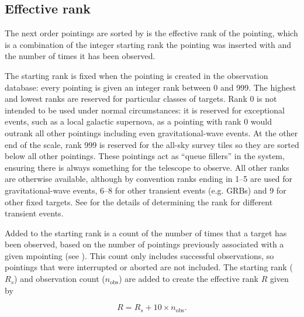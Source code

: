 \subsection{Effective rank}
\label{sec:rank}
\begin{colsection}

The next order pointings are sorted by is the effective rank of the pointing, which is a combination of the integer starting rank the pointing was inserted with and the number of times it has been observed.

The starting rank is fixed when the pointing is created in the observation database: every pointing is given an integer rank between 0 and 999. The highest and lowest ranks are reserved for particular classes of targets. Rank 0 is not intended to be used under normal circumstances: it is reserved for exceptional events, such as a local galactic supernova, as a pointing with rank 0 would outrank all other pointings including even gravitational-wave events. At the other end of the scale, rank 999 is reserved for the all-sky survey tiles so they are sorted below all other pointings. These pointings act as ``queue fillers'' in the system, ensuring there is always something for the telescope to observe. All other ranks are otherwise available, although by convention ranks ending in 1--5 are used for gravitational-wave events, 6--8 for other transient events (e.g. GRBs) and 9 for other fixed targets. See  for the details of determining the rank for different transient events.

Added to the starting rank is a count of the number of times that a target has been observed, based on the number of pointings previously associated with a given mpointing (see ). This count only includes successful observations, so pointings that were interrupted or aborted are not included. The starting rank ($R_s$) and observation count ($n_\text{obs}$) are added to create the effective rank $R$ given by

\begin{equation}
    R = R_s + 10\times n_\text{obs}.
    \label{eq:effective_rank}
\end{equation}


\end{colsection}
